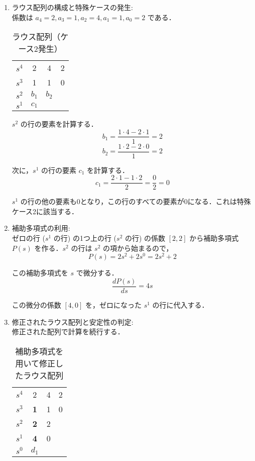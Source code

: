 \documentclass[11pt,a4paper]{ltjsarticle}
\begin{document}
\begin{enumerate}
\item ラウス配列の構成と特殊ケースの発生:\\
係数は $a_4=2, a_3=1, a_2=4, a_1=1, a_0=2$ である．

\begin{table}[ht]
\centering
\caption{ラウス配列（ケース2発生）}
\label{tbl:routh3}
\begin{tabular}{cccc}
\toprule
$s^4$ & 2 & 4 & 2 \\
$s^3$ & 1 & 1 & 0 \\
$s^2$ & $b_1$ & $b_2$ & \\
$s^1$ & $c_1$ & & \\
\bottomrule
\end{tabular}
\end{table}

$s^2$ の行の要素を計算する．
$$b_1 = \frac{1 \cdot 4 - 2 \cdot 1}{1} = 2$$
$$b_2 = \frac{1 \cdot 2 - 2 \cdot 0}{1} = 2$$

次に，$s^1$ の行の要素 $c_1$ を計算する．
$$c_1 = \frac{2 \cdot 1 - 1 \cdot 2}{2} = \frac{0}{2} = 0$$

$s^1$ の行の他の要素も0となり，この行のすべての要素が0になる．これは特殊ケース2に該当する．

\item 補助多項式の利用:\\
ゼロの行 ($s^1$ の行) の1つ上の行 ($s^2$ の行) の係数 $[2, 2]$ から補助多項式 $P(s)$ を作る．$s^2$ の行は $s^2$ の項から始まるので，
$$P(s) = 2s^2 + 2s^0 = 2s^2 + 2$$

この補助多項式を $s$ で微分する．
$$\frac{dP(s)}{ds} = 4s$$

この微分の係数 $[4, 0]$ を，ゼロになった $s^1$ の行に代入する．

\item 修正されたラウス配列と安定性の判定:\\
修正された配列で計算を続行する．

\begin{table}[ht]
\centering
\caption{補助多項式を用いて修正したラウス配列}
\label{tbl:routh3_corrected}
\begin{tabular}{cccc}
\toprule
$s^4$ & 2 & 4 & 2 \\
$s^3$ & \textbf{1} & 1 & 0 \\
$s^2$ & \textbf{2} & 2 & \\
$s^1$ & \textbf{4} & 0 & \\
$s^0$ & $d_1$ & & \\
\bottomrule
\end{tabular}
\end{table}


\end{enumerate}
\end{document}

